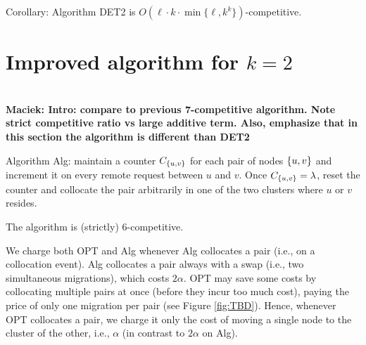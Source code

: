 \documentclass[manuscript,screen=true, review, anonymous]{acmart}
\DeclarePairedDelimiter\set{\{}{\}}
\newcommand\maciek[1]{\color{brown}\textbf{\\ Maciek: #1}\color{black}}
\begin{document}
Corollary: Algorithm DET2 is $O(\ell \cdot k \cdot \min \{ \ell, k^k \})$-competitive.



\section{Improved algorithm for $k=2$}
\label{sec:k2}

\maciek{Intro: compare to previous 7-competitive algorithm. Note strict competitive ratio vs large additive term. Also, emphasize that in this section the algorithm is different than DET2}

Algorithm Alg:
maintain a counter $C_{\set{u,v}}$ for each pair of nodes $\set{u,v}$ and increment it on every remote request between $u$ and $v$.
Once $C_{\set{u,v}} = \lambda$,
reset the counter and collocate the pair arbitrarily in one of the two clusters where $u$ or $v$ resides.

\begin{theorem} \label{thm:k=2}
	The algorithm is (strictly) 6-competitive.
\end{theorem}


We charge both OPT and Alg whenever Alg collocates a pair (i.e., on a collocation event).
Alg collocates a pair always with a swap (i.e., two simultaneous migrations),
which  costs $2\alpha$.
OPT may save some costs by collocating multiple pairs at once (before they incur too much cost),
paying the price of only one migration per pair  (see Figure \ref{fig:TBD}).
Hence,
whenever OPT collocates a pair,
we charge it only the cost of moving a single node to the cluster of the other,
i.e., $\alpha$ (in contrast to $2\alpha$ on Alg).
\end{document}
